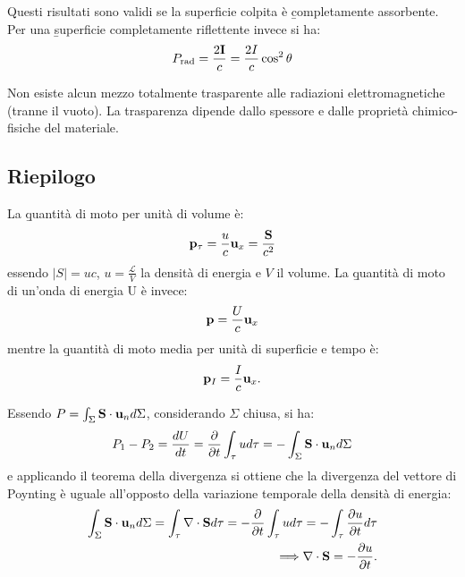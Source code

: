 Questi risultati sono validi se la superficie colpita è \b{completamente assorbente}. Per una \b{superficie completamente riflettente} invece si ha:
\begin{equation}\begin{split}
P_{\textrm{rad}}=\frac{2\mathbf{I}}{c}=\frac{2I}{c}\cos^2{\theta}
\end{split}\end{equation}

Non esiste alcun mezzo totalmente trasparente alle radiazioni elettromagnetiche (tranne il vuoto). La trasparenza dipende dallo spessore e dalle proprietà chimico-fisiche del materiale.

\subsection{Riepilogo}
La \b{quantità di moto per unità di volume} è:
\begin{equation}\begin{split}
\mathbf{p}_\tau=\frac{u}{c}\mathbf{u}_x=\frac{\mathbf{S}}{c^2}
\end{split}\end{equation}
essendo $|S|=u c$, $u=\frac{\mathcal{L}}{V}$ la densità di energia e $V$ il volume. La \b{quantità di moto di un'onda di energia U} è invece:
\begin{equation}\begin{split}
\mathbf{p}=\frac{U}{c}\mathbf{u}_x
\end{split}\end{equation}
mentre la \b{quantità di moto media per unità di superficie e tempo} è:
\begin{equation}\begin{split}
\mathbf{p}_I=\frac{I}{c}\mathbf{u}_x.
\end{split}\end{equation}

Essendo $P=\int_{\Sigma}{\mathbf{S}\cdot\mathbf{u}_n d\Sigma}$, considerando $\Sigma$ chiusa, si ha:
\begin{equation}\begin{split}
P_1-P_2=\frac{dU}{dt}=\frac{\partial}{\partial t}\int_\tau{ud\tau}=-\int_\Sigma{\mathbf{S}\cdot\mathbf{u}_nd\Sigma}
\end{split}\end{equation}
e applicando il teorema della divergenza si ottiene che la divergenza del vettore di Poynting è uguale all'opposto della variazione temporale della densità di energia:
\begin{equation}\begin{split}
\int_\Sigma{\mathbf{S}\cdot\mathbf{u}_nd\Sigma}=\int_\tau{\nabla\cdot\mathbf{S}d\tau}=-\frac{\partial}{\partial t}\int_\tau{ud\tau}=-\int_\tau{\frac{\partial u}{\partial t}d\tau}\\
\Longrightarrow \nabla\cdot\mathbf{S}=-\frac{\partial u}{\partial t}.
\end{split}\end{equation}


